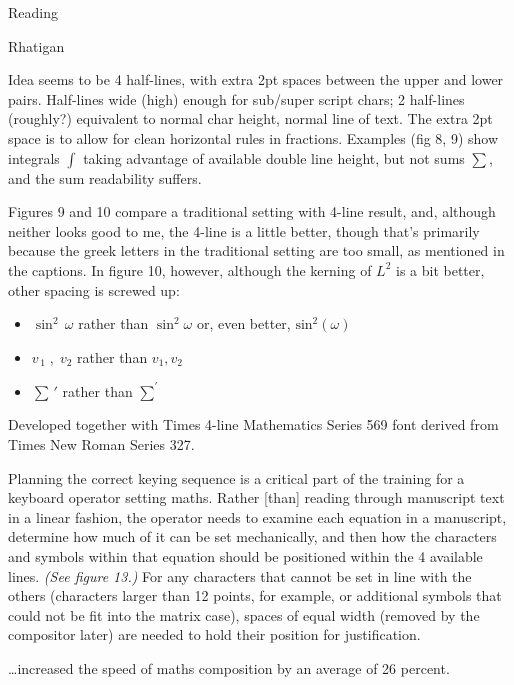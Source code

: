 \documentclass[11pt]{PalisadesLakesBook}
\begin{document}
\begin{plSection}{Reading}
\begin{plSection}{Rhatigan}
\begin{plSection}{}
Idea seems to be 4 half-lines, with extra 2pt spaces between the 
upper and lower pairs.
Half-lines wide (high) enough for sub/super script chars;
2 half-lines (roughly?) equivalent to normal char height, 
normal line of text.
The extra 2pt space is to allow for clean horizontal rules in
fractions.
Examples (fig 8, 9) show integrals $\int$ 
taking advantage of 
available double line height, but not sums $\sum$,
and the sum readability suffers.

Figures 9 and 10 compare a traditional setting with 4-line result,
and, although neither looks good to me,
the 4-line is a little better,
though that's primarily because the greek letters 
in the traditional setting are too small,
as mentioned in the captions.
In figure 10, however, although the kerning of 
$L^2$ is a bit better, other spacing is screwed up:
\begin{itemize}
\item $\sin^2 \,\omega$ rather than $\sin^{2}\!\omega$ or, even better, 
 $\textrm{sin}^{2}\!\left(\omega\right)$
\item $v_{\,1}\;,\;v_{2}$ rather than $v_{1},v_{2}$
\item $\sum\,'$ rather than $\sum^{'}$
\end{itemize}

Developed together with Times 4-line Mathematics Series 569 font
derived from Times New Roman Series 327. 

\begin{plQuote}{}
{}
Planning the correct keying sequence is a critical part of the
training for a keyboard operator setting maths.
Rather [than] reading through manuscript text 
in a linear fashion,
the operator needs to examine each equation in a manuscript,
determine how much of it can be set mechanically,
and then how the characters and symbols within that equation
should be positioned within the 4 available lines. 
\textit{(See figure 13.)}
For any characters that cannot be set in line with the others
(characters larger than 12 points, for example,
or additional symbols that could not be fit into the matrix case),
spaces of equal width (removed by the compositor later)
are needed to hold their position for justification.
\end{plQuote}

\begin{plQuote}{}
{}
\ldots increased the speed of maths composition 
by an average of 26 percent.
\end{plQuote}


\end{plSection}
\end{plSection}
\end{plSection}
\end{document}
